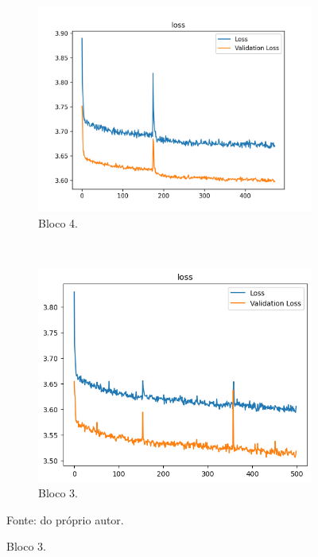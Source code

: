 \begin{figure}[H]
     \begin{subfigure}[t]{0.45\textwidth}
         \centering
         \includegraphics[width=1\linewidth]{recursos/imagens/results/cifar_loss2.png}
         \caption{Bloco 4.}
         \label{results:fig:datasets:2.3}
     \end{subfigure}
     ~
     \begin{subfigure}[t]{0.45\textwidth}
         \centering
         \includegraphics[width=1\linewidth]{recursos/imagens/results/cifar_loss3.png}
         \caption{Bloco 3.}
         \label{results:fig:datasets:2.4}
     \end{subfigure}
     
     Fonte: do próprio autor.
 \end{figure}


